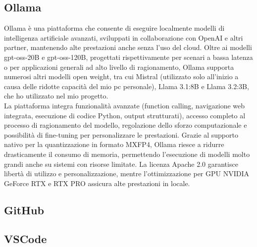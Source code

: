 \subsection{Ollama}
\noindent Ollama è una piattaforma che consente di eseguire localmente modelli di intelligenza artificiale avanzati, sviluppati in collaborazione con OpenAI e altri partner, mantenendo alte prestazioni anche senza l’uso del cloud. 
Oltre ai modelli gpt-oss-20B e gpt-oss-120B, progettati rispettivamente per scenari a bassa latenza o per applicazioni generali ad alto livello di ragionamento, Ollama supporta numerosi altri modelli open weight, tra cui Mistral (utilizzato solo all’inizio a causa delle ridotte capacità del mio pc personale), Llama 3.1:8B e Llama 3.2:3B, che ho utilizzato nel mio progetto.\\ 
La piattaforma integra funzionalità avanzate (function calling, navigazione web integrata, esecuzione di codice Python, output strutturati), accesso completo al processo di ragionamento del modello, regolazione dello sforzo computazionale e possibilità di fine-tuning per personalizzare le prestazioni. 
Grazie al supporto nativo per la quantizzazione in formato MXFP4, Ollama riesce a ridurre drasticamente il consumo di memoria, permettendo l’esecuzione di modelli molto grandi anche su sistemi con risorse limitate. 
La licenza Apache 2.0 garantisce libertà di utilizzo e personalizzazione, mentre l’ottimizzazione per GPU NVIDIA GeForce RTX e RTX PRO assicura alte prestazioni in locale.


\subsection{GitHub}

\subsection{VSCode}

\newpage